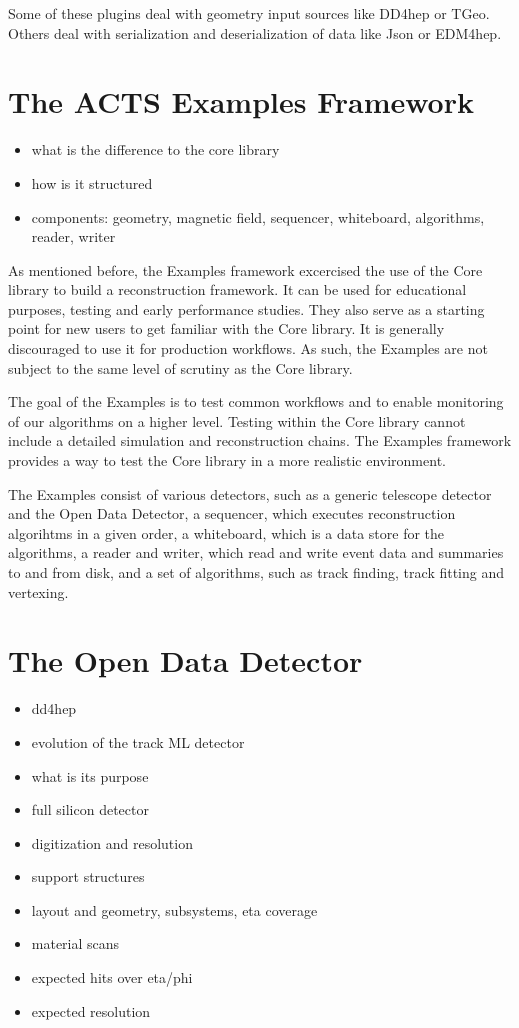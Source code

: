 Some of these plugins deal with geometry input sources like DD4hep or TGeo. Others deal with serialization and deserialization of data like Json or EDM4hep.

\section{The ACTS Examples Framework}

\begin{itemize}
    \color{red}
    \item what is the difference to the core library
    \item how is it structured
    \item components: geometry, magnetic field, sequencer, whiteboard, algorithms, reader, writer
\end{itemize}

As mentioned before, the Examples framework excercised the use of the Core library to build a reconstruction framework. It can be used for educational purposes, testing and early performance studies. They also serve as a starting point for new users to get familiar with the Core library. It is generally discouraged to use it for production workflows. As such, the Examples are not subject to the same level of scrutiny as the Core library.

The goal of the Examples is to test common workflows and to enable monitoring of our algorithms on a higher level. Testing within the Core library cannot include a detailed simulation and reconstruction chains. The Examples framework provides a way to test the Core library in a more realistic environment.

The Examples consist of various detectors, such as a generic telescope detector and the Open Data Detector, a sequencer, which executes reconstruction algorihtms in a given order, a whiteboard, which is a data store for the algorithms, a reader and writer, which read and write event data and summaries to and from disk, and a set of algorithms, such as track finding, track fitting and vertexing.

\section{The Open Data Detector}

\begin{itemize}
    \color{red}
    \item dd4hep
    \item evolution of the track ML detector
    \item what is its purpose
    \item full silicon detector
    \item digitization and resolution
    \item support structures
    \item layout and geometry, subsystems, eta coverage
    \item material scans
    \item expected hits over eta/phi
    \item expected resolution
\end{itemize}

